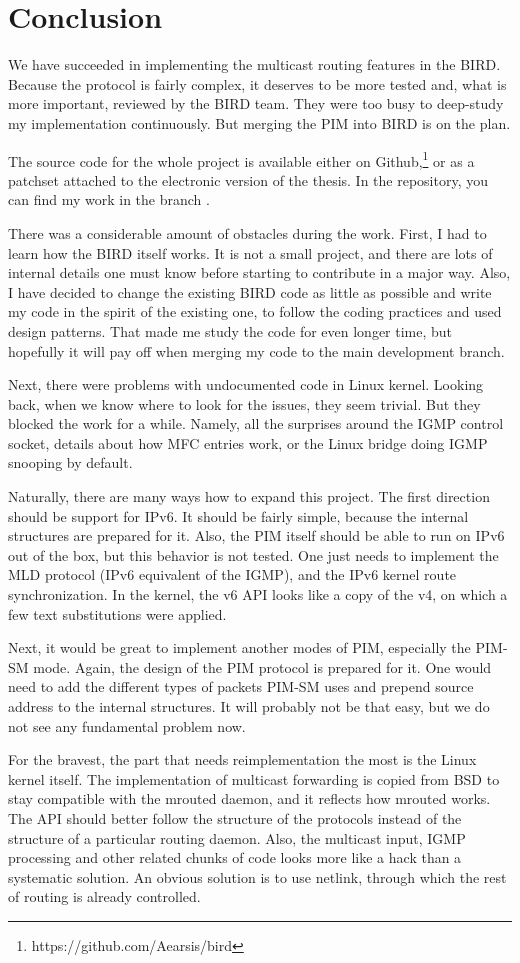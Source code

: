 \chapter*{Conclusion}

We have succeeded in implementing the multicast routing features in the BIRD.
Because the protocol is fairly complex, it deserves to be more tested and, what
is more important, reviewed by the BIRD team. They were too busy to deep-study
my implementation continuously. But merging the PIM into BIRD is on the plan.

The source code for the whole project is available either on Github,\footnote{https://github.com/Aearsis/bird}
or as a patchset attached to the electronic version of the thesis.
In the repository, you can find my work in the branch .

There was a considerable amount of obstacles during the work. First, I had to
learn how the BIRD itself works. It is not a small project, and there are lots
of internal details one must know before starting to contribute in a major way.
Also, I have decided to change the existing BIRD code as little as possible and
write my code in the spirit of the existing one, to follow the coding practices
and used design patterns. That made me study the code for even longer time, but
hopefully it will pay off when merging my code to the main development branch.

Next, there were problems with undocumented code in Linux kernel. Looking back,
when we know where to look for the issues, they seem trivial. But they blocked
the work for a while. Namely, all the surprises around the IGMP control socket,
details about how MFC entries work, or the Linux bridge doing IGMP snooping by
default.

Naturally, there are many ways how to expand this project. The first direction
should be support for IPv6. It should be fairly simple, because the internal
structures are prepared for it. Also, the PIM itself should be able to run on
IPv6 out of the box, but this behavior is not tested. One just needs to
implement the MLD protocol (IPv6 equivalent of the IGMP), and the IPv6 kernel
route synchronization. In the kernel, the v6 API looks like a copy of the v4,
on which a few text substitutions were applied.

Next, it would be great to implement another modes of PIM, especially the PIM-SM mode.
Again, the design of the PIM protocol is prepared for it. One would need to
add the different types of packets PIM-SM uses and prepend source address to
the internal structures. It will probably not be that easy, but we do not see
any fundamental problem now.

For the bravest, the part that needs reimplementation the most is the Linux
kernel itself. The implementation of multicast forwarding is copied from BSD to
stay compatible with the mrouted daemon, and it reflects how mrouted works.
The API should better follow the structure of the protocols instead of the
structure of a particular routing daemon. Also, the multicast input, IGMP
processing and other related chunks of code looks more like a hack than
a systematic solution. An obvious solution is to use netlink, through which the
rest of routing is already controlled.
